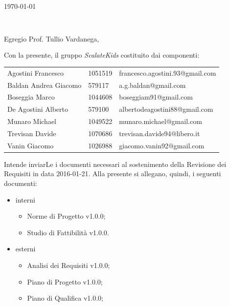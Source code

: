 \documentclass[10pt,a4paper]{letter} %
\makeatletter
\def\opening#1{\thispagestyle{empty}
  {\centering\fromaddress \vspace{0.6in} \\ %
    \hspace*{\longindentation}\today\hspace*{\fill}\par} %
  {\raggedright \toname \\ \toaddress \par} %
  \vspace{0.4in} %
  \noindent #1 %
  \def\thefootnote{}
  \def\footnoterule{\hrule}
  \footnotetext{\hspace*{\fill}{\footnotesize\em ScalateKids - scalatekids@gmail.com}}
  \def\thefootnote{\arabic{footnote}}
}
\makeatother
\begin{document}

\begin{letter}{}


  \opening{Egregio Prof. Tullio Vardanega,\\}

  Con la presente, il gruppo \textit{ScalateKids} costituito dai componenti:
  \begin{center}
    \begin{tabular}[H]{l l l}
      Agostini Francesco & 1051519 & francesco.agostini.93@gmail.com \\
      Baldan Andrea Giacomo & 579117 & a.g.baldan@gmail.com \\
      Boseggia Marco & 1044608 & boseggiam91@gmail.com \\
      De Agostini Alberto & 579100 & albertodeagostini88@gmail.com \\
      Munaro Michael & 1049522 & munaro.michael@gmail.com \\
      Trevisan Davide & 1070686 & trevisan.davide94@libero.it \\
      Vanin Giacomo & 1026988 & giacomo.vanin92@gmail.com \\
    \end{tabular}
  \end{center}
  Intende inviarLe i documenti necessari al sostenimento della Revisione dei Requisiti in data 2016-01-21.
  Alla presente si allegano, quindi, i seguenti documenti:
  \begin{itemize}
  \item interni
    \begin{itemize}
    \item Norme di Progetto v1.0.0;
    \item Studio di Fattibilità v1.0.0.
    \end{itemize}
  \item esterni
    \begin{itemize}
    \item Analisi dei Requisiti v1.0.0;
    \item Piano di Progetto v1.0.0;
    \item Piano di Qualifica v1.0.0;

\end{itemize}
\end{itemize}
\end{letter}
\end{document}
